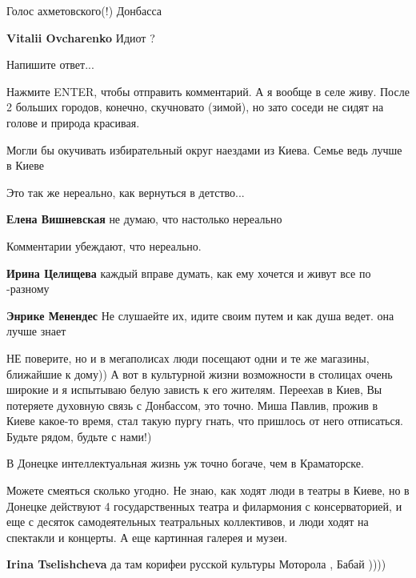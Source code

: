 \begin{itemize}
Голос ахметовского(!) Донбасса

\textbf{Vitalii Ovcharenko} Идиот ?

Напишите ответ...

Нажмите ENTER, чтобы отправить комментарий.
А я вообще в селе живу. После 2 больших городов, конечно, скучновато (зимой), но зато соседи не сидят на голове и природа красивая.

Могли бы окучивать избирательный округ наездами из Киева. Семье ведь лучше в Киеве

Это так же нереально, как вернуться в детство...

\begin{itemize} %
\textbf{Елена Вишневская} не думаю, что настолько нереально

Комментарии убеждают, что нереально.

\textbf{Ирина Целищева} каждый вправе думать, как ему хочется и живут все по -разному

\textbf{Энрике Менендес} Не слушаейте их, идите своим путем и как душа ведет. она лучше знает
\end{itemize} %


НЕ поверите, но и в мегаполисах люди посещают одни и те же магазины, ближайшие
к дому)) А вот в культурной жизни возможности в столицах очень широкие и я
испытываю белую зависть к его жителям. Переехав в Киев, Вы потеряете духовную
связь с Донбассом, это точно. Миша Павлив, прожив в Киеве какое-то время, стал
такую пургу гнать, что пришлось от него отписаться. Будьте рядом, будьте с
нами!)

В Донецке интеллектуальная жизнь уж точно богаче, чем в Краматорске.

\begin{itemize} %

Можете смеяться сколько угодно. Не знаю, как ходят люди в театры в Киеве, но в
Донецке действуют 4 государственных театра и филармония с консерваторией, и еще
с десяток самодеятельных театральных коллективов, и люди ходят на спектакли и
концерты. А еще картинная галерея и музеи.


\textbf{Irina Tselishcheva} да там корифеи русской культуры Моторола , Бабай ))))


\end{itemize}
\end{itemize}
